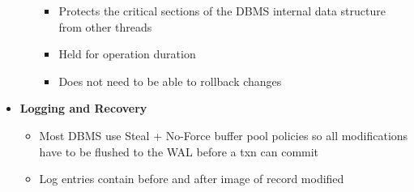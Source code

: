 \documentclass[11pt]{article}
\begin{document}
\begin{itemize}
\begin{itemize}
        \begin{itemize}
            \item Protects the critical sections of the DBMS internal data structure from other threads
            \item Held for operation duration
            \item Does not need to be able to rollback changes
        \end{itemize}
    \end{itemize}
    \item \textbf{Logging and Recovery}
    \begin{itemize}
        \item Most DBMS use Steal + No-Force buffer pool policies so all modifications have to be flushed to the WAL before a txn can commit
        \item Log entries contain before and after image of record modified
    \end{itemize}

\end{itemize}
\end{document}
